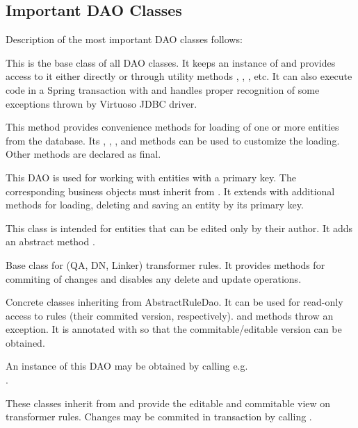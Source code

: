 \subsection{Important DAO Classes}
Description of the most important DAO classes follows:

\begin{description}[style=nextline,font=\ttfamily]
	\item[Dao] This is the base class of all DAO classes. It keeps an instance of  and provides access to it either directly or through utility methods , , , etc. It can also execute code in a Spring transaction with  and handles proper recognition of some exceptions thrown by Virtuoso JDBC driver.
	\item[DaoTemplate] This method provides convenience methods for loading of one or more entities from the database. Its , , ,  and  methods can be used to customize the loading. Other methods are declared as final.
	\item[DaoForEntityWithSurrogateKey] This DAO is used for working with entities with a primary key. The corresponding business objects must inherit from . It extends  with additional methods for loading, deleting and saving an entity by its primary key.
	\item[DaoForAuthorableEntity] This class is intended for entities that can be edited only by their author. It adds an abstract method .
	\item[AbstractRuleDao] Base class for (QA, DN, Linker) transformer rules. It provides methods for commiting of changes and disables any delete and update operations.
	\item[XXXRuleDao] Concrete classes inheriting from AbstractRuleDao. It can be used for read-only access to rules (their commited version, respectively).  and  methods throw an exception. It is annotated with  so that the commitable/editable version can be obtained.

		An instance of this DAO may be obtained by calling e.g.\\
		.
	\item[XXXRuleUncommittedDao] These classes inherit from  and provide the editable and commitable view on transformer rules. Changes may be commited in transaction by calling .


\end{description}
